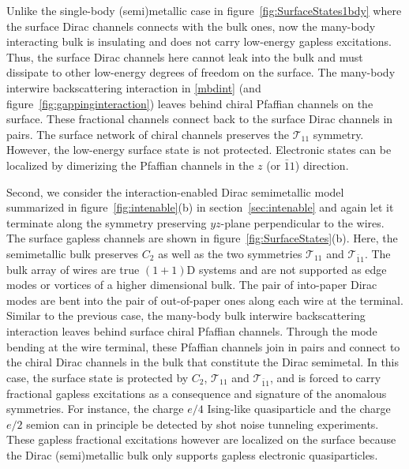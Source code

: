 Unlike the single-body (semi)metallic case in figure~\ref{fig:SurfaceStates1bdy} where the surface Dirac channels connects with the bulk ones, now the many-body interacting bulk is insulating and does not carry low-energy gapless excitations. Thus, the surface Dirac channels here cannot leak into the bulk and must dissipate to other low-energy degrees of freedom on the surface. The many-body interwire backscattering interaction in \eqref{mbdint} (and figure~\ref{fig:gappinginteraction}) leaves behind chiral Pfaffian channels on the surface. These fractional channels connect back to the surface Dirac channels in pairs. The surface network of chiral channels preserves the \AFTR $\mathcal{T}_{11}$ symmetry. However, the low-energy surface state is not protected. Electronic states can be localized by dimerizing the Pfaffian channels in the $z$ (or $\bar{1}1$) direction.

Second, we consider the interaction-enabled Dirac semimetallic model summarized in figure~\ref{fig:intenable}(b) in section~\ref{sec:intenable} and again let it terminate along the symmetry preserving $yz$-plane perpendicular to the wires. The surface gapless channels are shown in figure~\ref{fig:SurfaceStates}(b). Here, the semimetallic bulk preserves $C_2$ as well as the two \AFTR symmetries $\mathcal{T}_{11}$ and $\mathcal{T}_{\bar{1}1}$. The bulk array of wires are true $(1+1)$D systems and are not supported as edge modes or vortices of a higher dimensional bulk. The pair of into-paper Dirac modes are bent into the pair of out-of-paper ones along each wire at the terminal. Similar to the previous case, the many-body bulk interwire backscattering interaction leaves behind surface chiral Pfaffian channels. Through the mode bending at the wire terminal, these Pfaffian channels join in pairs and connect to the chiral Dirac channels in the bulk that constitute the Dirac semimetal. In this case, the surface state is protected by $C_2$, $\mathcal{T}_{11}$ and $\mathcal{T}_{\bar{1}1}$, and is forced to carry fractional gapless excitations as a consequence and signature of the anomalous symmetries. For instance, the charge $e/4$ Ising-like quasiparticle and the charge $e/2$ semion can in principle be detected by shot noise tunneling experiments. These gapless fractional excitations however are localized on the surface because the Dirac (semi)metallic bulk only supports gapless electronic quasiparticles.


